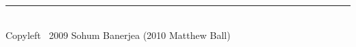 \documentclass[10pt,landscape]{article}
\makeatletter
\renewcommand{\section}{\@startsection{section}{1}{0mm}%
				{-1ex plus -.5ex minus -.2ex}%
				{0.5ex plus .2ex}%
				{\normalfont\large\bfseries}}
\renewcommand{\subsubsection}{\@startsection{subsubsection}{3}{0mm}%
				{-1ex plus -.5ex minus -.2ex}%
				{1ex plus .2ex}%
				{\normalfont\small\bfseries}}
\makeatother
\begin{document}
\begin{multicols}{3}

\rule{0.3\linewidth}{0.25pt}
\scriptsize\\
Copyleft \textcopyleft\ 2009 Sohum Banerjea (2010 Matthew Ball)
\end{multicols}
\end{document}
